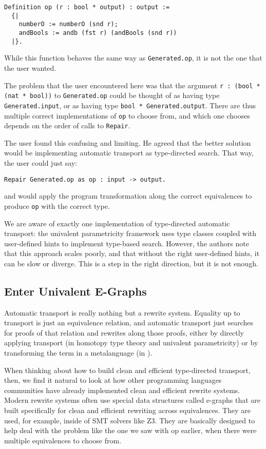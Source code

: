 \begin{lstlisting}
Definition op (r : bool * output) : output := 
  {|
    numberO := numberO (snd r);
    andBools := andb (fst r) (andBools (snd r))
  |}.
\end{lstlisting}
While this function behaves the same way as \lstinline{Generated.op}, it is not the one that the user wanted.

The problem that the user encountered here was that the argument \lstinline{r : (bool * (nat * bool))} to
\lstinline{Generated.op} could be thought of as having type \lstinline{Generated.input}, or as having type
\lstinline{bool * Generated.output}.
There are thus multiple correct implementations of \lstinline{op} to choose from,
and which one \toolname chooses depends on the order of calls to \lstinline{Repair}.

The user found this confusing and limiting.
He agreed that the better solution would be implementing automatic transport as type-directed search.
That way, the user could just say:

\begin{lstlisting}
Repair Generated.op as op : input -> output.
\end{lstlisting}
and \toolname would apply the program transformation along the correct equivalences
to produce \lstinline{op} with the correct type.

We are aware of exactly one implementation of type-directed automatic transport:
the univalent parametricity framework uses type classes coupled with user-defined hints to implement type-based search.
However, the authors note that this approach scales poorly, and that without the right user-defined
hints, it can be slow or diverge.
This is a step in the right direction, but it is not enough.

\subsection{Enter Univalent E-Graphs}
\label{sec:egraph}

Automatic transport is really nothing but a rewrite system.
Equality up to transport is just an equivalence relation, and automatic transport just searches for proofs of that relation and rewrites along those proofs, either by directly applying transport (in homotopy type theory and univalent parametricity) or by transforming the term in a metalanguage (in \toolname).

When thinking about how to build clean and efficient type-directed transport, then, we find it natural to look
at how other programming languages communities have already implemented clean and efficient rewrite systems.
Modern rewrite systems often use special data structures called e-graphs that are built specifically
for clean and efficient rewriting across equivalences.
They are used, for example, inside of SMT solvers like Z3.
They are basically designed to help deal with the problem like the one we saw with op earlier, when there were multiple equivalences to 
choose from.

